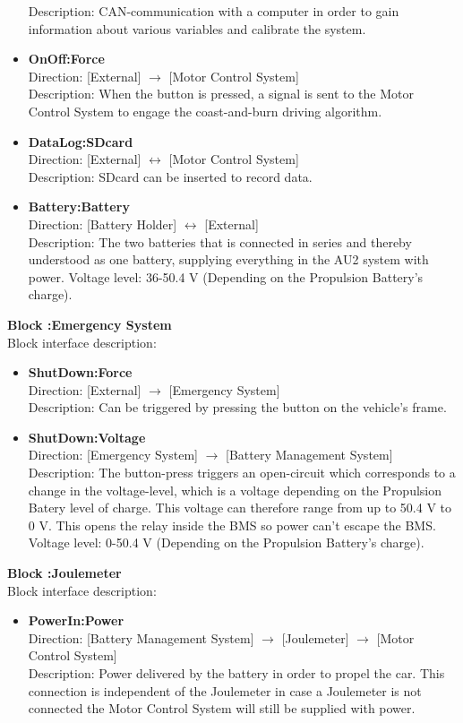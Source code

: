 \begin{itemize}
	Description: CAN-communication with a computer in order to gain information about various variables and calibrate the system.
	\item \textbf{OnOff:Force}\\
	Direction: [External] $\rightarrow$ [Motor Control System]\\
	Description: When the button is pressed, a signal is sent to the Motor Control System to engage the coast-and-burn driving algorithm. 
	\item \textbf{DataLog:SDcard}\\
	Direction: [External] $\leftrightarrow$ [Motor Control System]\\
	Description: SDcard can be inserted to record data.
	\item \textbf{Battery:Battery}\\
	Direction: [Battery Holder] $\leftrightarrow$ [External]\\
	Description: The two batteries that is connected in series and thereby understood as one battery, supplying everything in the AU2 system with power.
	Voltage level: 36-50.4 V (Depending on the Propulsion Battery's charge).
\end{itemize}

\textbf{Block :Emergency System}\\
Block interface description:
\begin{itemize}
	\item \textbf{ShutDown:Force}\\
	Direction: [External] $\rightarrow$ [Emergency System]\\
	Description: Can be triggered by pressing the button on the vehicle's frame.
	\item \textbf{ShutDown:Voltage}\\
	Direction: [Emergency System] $\rightarrow$ [Battery Management System]\\
	Description: The button-press triggers an open-circuit which corresponds to a change in the voltage-level, which is a voltage depending on the Propulsion Batery level of charge. This voltage can therefore range from up to 50.4 V to 0 V. This opens the relay inside the BMS so power can't escape the BMS.\\
	Voltage level: 0-50.4 V (Depending on the Propulsion Battery's charge).
	
\end{itemize}

\textbf{Block :Joulemeter}\\
Block interface description:
\begin{itemize}
	\item \textbf{PowerIn:Power}\\
	Direction: [Battery Management System] $\rightarrow$ [Joulemeter] $\rightarrow$ [Motor Control System]\\
	Description: Power delivered by the battery in order to propel the car. This connection is independent of the Joulemeter in case a Joulemeter is not connected the Motor Control System will still be supplied with power.
\end{itemize}


